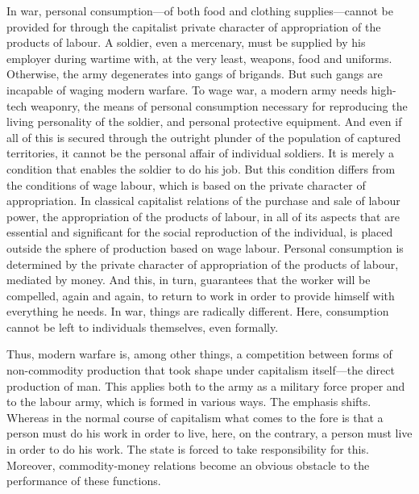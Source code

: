 \documentclass[../main]{subfiles}
\begin{document}
In war, personal consumption—of both food and clothing supplies—cannot be provided for through the capitalist private character of appropriation of the products of labour. A soldier, even a mercenary, must be supplied by his employer during wartime with, at the very least, weapons, food and uniforms. Otherwise, the army degenerates into gangs of brigands. But such gangs are incapable of waging modern warfare. To wage war, a modern army needs high-tech weaponry, the means of personal consumption necessary for reproducing the living personality of the soldier, and personal protective equipment. And even if all of this is secured through the outright plunder of the population of captured territories, it cannot be the personal affair of individual soldiers. It is merely a condition that enables the soldier to do his job. But this condition differs from the conditions of wage labour, which is based on the private character of appropriation. In classical capitalist relations of the purchase and sale of labour power, the appropriation of the products of labour, in all of its aspects that are essential and significant for the social reproduction of the individual, is placed outside the sphere of production based on wage labour. Personal consumption is determined by the private character of appropriation of the products of labour, mediated by money. And this, in turn, guarantees that the worker will be compelled, again and again, to return to work in order to provide himself with everything he needs. In war, things are radically different. Here, consumption cannot be left to individuals themselves, even formally.

Thus, modern warfare is, among other things, a competition between forms of non-commodity production that took shape under capitalism itself—the direct production of man. This applies both to the army as a military force proper and to the labour army, which is formed in various ways. The emphasis shifts. Whereas in the normal course of capitalism what comes to the fore is that a person must do his work in order to live, here, on the contrary, a person must live in order to do his work. The state is forced to take responsibility for this. Moreover, commodity-money relations become an obvious obstacle to the performance of these functions.
\end{document}
